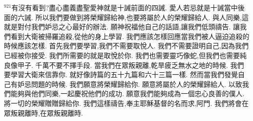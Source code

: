 \documentclass{book}
\begin{document}
$^{921}$有沒有看到?盡心盡義盡聖愛神就是十誡前面的四誡.
愛人若忌就是十誡當中後面的六誡.
所以我們要做到將榮耀歸給神,也要將屬於人的榮耀歸給人.
與人同樂,這就是對付我們妒忌之心最好的辦法.
願神祝福他自己的話語,讓我們低頭禱告.
讓我們看到大衛被掃羅追殺,從他的身上學習.
我們應該怎樣回應當我們被人逼迫追殺的時候應該怎樣.
首先我們要學習,我們不需要取悅人.
我們不需要證明自己,因為我們已經被你接受.
我們所需要的就是取悅於你.
我們也需要靈巧像蛇,但我們也需要純良像甲子.
千萬不要不擇手段.
當我們在眾叛親離,乾旱疲乏無水之地的時候.
我們要學習大衛來信靠你.
就好像詩篇的五十九篇和六十三篇一樣.
然而當我們發覺自己有妒忌問題的時候.
我們願意將榮耀歸給你.
願意將屬於人的榮耀歸給人.
以致我們能夠與他們同樂,一起慶祝他們的成功.
願意我們能夠成為一個忠心良善的僕人.
將一切的榮耀贈贈歸給你.
我們這樣禱告,奉主耶穌基督的名而求,阿門.
我們將會在眾叛親離時,在眾叛親離時.
\newpage
\end{document}
